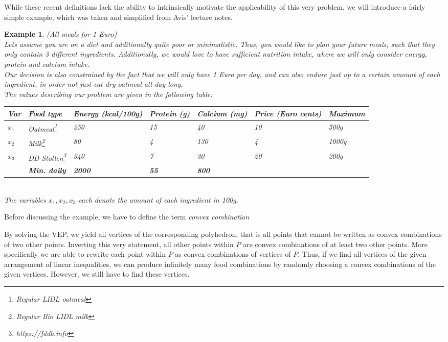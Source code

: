 \documentclass[a4paper, 11pt]{article}
\newtheorem{example}{Example}
\begin{document}
While these recent definitions lack the ability to intrinsically motivate the applicability of this very problem, we will introduce a fairly simple example, which was taken and simplified from Avis' lecture notes.
\begin{example}(All meals for 1 Euro)\\
	Lets assume you are on a diet and additionally quite poor or minimalistic. Thus, you would like to plan your future meals, such that they only contain 3 different ingredients. Additionally, we would love to have sufficient nutrition intake, where we will only consider energy, protein and calcium intake.\\
	Our decision is also constrained by the fact that we will only have 1 Euro per day, and can also endure just up to a certain amount of each ingredient, in order not just eat dry oatmeal all day long.\\
	The values describing our problem are given in the following table:\\
	\begingroup
	\def\arraystretch{1.5}
	\begin{tabular}{|p{0.5cm}|l|p{2cm}|p{1.5cm}|p{1.5cm}|p{1.5cm}|p{2cm}|}
		\hline
		Var&Food type&Energy (kcal/100g)&Protein (g)&Calcium (mg)&Price (Euro cents)&Maximum\\
		\hline
		$x_1$&Oatmeal\footnote{Regular LIDL oatmeal}&250&15&40&10&500g\\
		$x_2$&Milk\footnote{Regular Bio LIDL milk}&80&4&130&4&1000g\\
		$x_3$&DD Stollen\footnote{https://fddb.info}&340&7&30&20&200g\\
		\hline
		&\textbf{Min. daily}&\textbf{2000}&\textbf{55}&\textbf{800}&&\\
		\hline
	\end{tabular}
	\endgroup\\
	
	The variables $x_1, x_2, x_3$ each denote the amount of each ingredient in 100g.
\end{example}
Before discussing the example, we have to define the term \textit{convex combination}



By solving the VEP, we yield all vertices of the corresponding polyhedron, that is all points that cannot be written as convex combinations of two other points. Inverting this very statement, all other points within $P$ are convex combinations of at least two other points. More specifically we are able to rewrite each point within $P$ as convex combinations of vertices of $P$. Thus, if we find all vertices of the given arrangement of linear inequalities, we can produce infinitely many food combinations by randomly choosing a convex combinations of the given vertices. However, we still have to find these vertices.
\end{document}
